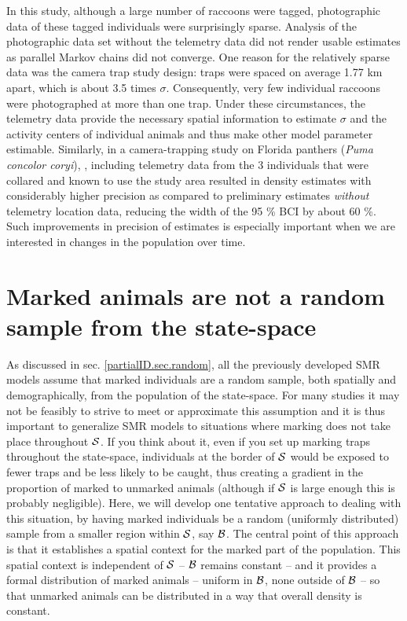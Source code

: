 In this study, although a large number of raccoons were tagged, photographic data of these tagged individuals were surprisingly sparse. Analysis of the photographic data set without the telemetry data did not render usable estimates as parallel Markov chains did not converge. One reason for the relatively sparse data was the camera trap study design: traps were spaced on average 1.77 km apart, which is about 3.5 times $\sigma$. Consequently, very few individual raccoons were photographed at more than one trap. Under these circumstances, the telemetry data provide the necessary spatial information to estimate $\sigma$ and the activity centers of individual animals and thus make other model parameter estimable. Similarly, in a camera-trapping study on Florida panthers (\emph{Puma concolor coryi}), \citet{sollmann_etal:inprepjapplecol}, including telemetry data from the 3 individuals that were collared and known to use the study area resulted in density estimates with considerably higher precision as compared to preliminary estimates \emph{without} telemetry location data, reducing the width of the 95 \% BCI by about 60 \%. Such improvements in precision of estimates is especially important when we are interested in changes in the population over time.


\section{Marked animals are not a random sample from the state-space}
As discussed in sec. \ref{partialID.sec.random}, all the previously developed SMR models assume that marked individuals are a random sample, both spatially and demographically, from the population of the state-space. For many studies it may not be feasibly to strive to meet or approximate this assumption and it is thus important to generalize SMR models to situations where marking does not take place throughout ${\cal S}$. If you think about it, even if you set up marking traps throughout the state-space, individuals at the border of ${\cal S}$ would be exposed to fewer traps and be less likely to be caught, thus creating a gradient in the proportion of marked to unmarked animals (although if ${\cal S}$ is large enough this is probably negligible). Here, we will develop one tentative approach to dealing with this situation, by having marked individuals be a random (uniformly distributed) sample from a smaller region within ${\cal S}$, say ${\cal B}$.
The central point of this approach is that it establishes a spatial context for the marked part of the population. This spatial context is independent of ${\cal S}$ -- ${\cal B}$ remains constant -- and it provides a formal distribution of marked animals -- uniform in ${\cal B}$, none outside of ${\cal B}$ -- so that unmarked animals can be distributed in a way that overall density is constant.




